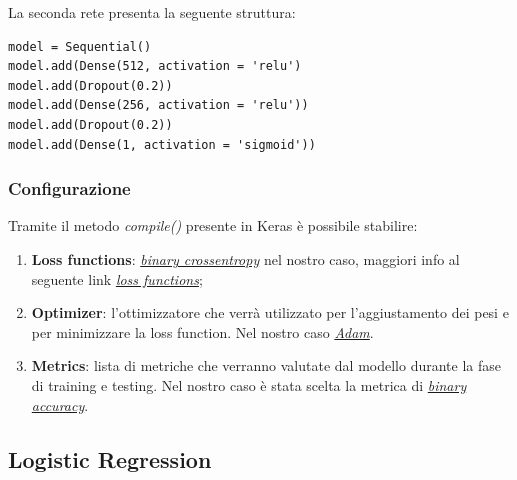 La seconda rete presenta la seguente struttura:
\begin{lstlisting}[backgroundcolor = \color{white}]
model = Sequential()
model.add(Dense(512, activation = 'relu')
model.add(Dropout(0.2))
model.add(Dense(256, activation = 'relu'))
model.add(Dropout(0.2))
model.add(Dense(1, activation = 'sigmoid'))
\end{lstlisting}


\subsubsection{Configurazione}
Tramite il metodo \textit{compile()} presente in Keras è possibile stabilire:
\begin{enumerate}
	\item \textbf{Loss functions}: \href{https://en.wikipedia.org/wiki/Cross_entropy}{\textit{binary crossentropy}} nel nostro caso, maggiori info al seguente link \href{https://keras.io/losses/}{\textit{loss functions}};
	\item \textbf{Optimizer}: l'ottimizzatore che verrà utilizzato per l'aggiustamento dei pesi e per minimizzare la loss function.
	Nel nostro caso \href{https://arxiv.org/pdf/1412.6980v8.pdf}{\textit{Adam}}. 
	\item \textbf{Metrics}: lista di metriche che verranno valutate dal modello durante la fase di training e testing.
	Nel nostro caso è stata scelta la metrica di \href{https://keras.io/metrics/#binary_accuracy}{\textit{binary accuracy}}.  
\end{enumerate} 
\subsection{Logistic Regression}


